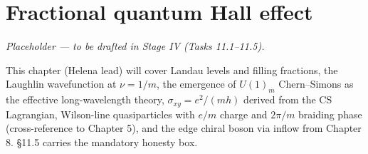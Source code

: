 \chapter{Fractional quantum Hall effect}\label{ch:fqh}

\emph{Placeholder --- to be drafted in Stage IV (Tasks 11.1--11.5).}

This chapter (Helena lead) will cover Landau levels and filling fractions, the Laughlin wavefunction at $\nu = 1/m$, the emergence of $U(1)_m$ Chern--Simons as the effective long-wavelength theory, $\sigma_{xy} = e^2/(mh)$ derived from the CS Lagrangian, Wilson-line quasiparticles with $e/m$ charge and $2\pi/m$ braiding phase (cross-reference to Chapter 5), and the edge chiral boson via inflow from Chapter 8. \S11.5 carries the mandatory honesty box.
